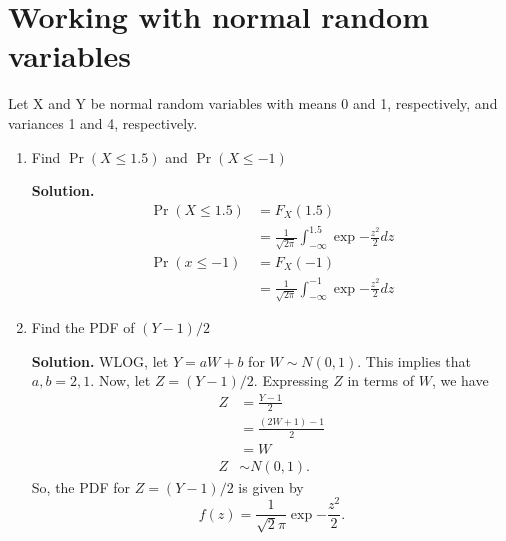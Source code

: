\documentclass[12pt]{article}
\begin{document}
\section{Working with normal random variables}
Let X and Y be normal random variables with means 0 and 1, respectively, and variances 1 and 4, respectively.
\begin{enumerate}
    \item Find $\Pr(X \leq 1.5)$ and $\Pr(X \leq -1)$

    \textbf{Solution.}
    \begin{align*}
        \Pr(X \leq 1.5) &= F_X(1.5) 
        \\ &= \frac{1}{\sqrt{2\pi}}\int_{-\infty}^{1.5} \exp{-\frac{z^2}{2}}dz
        \\ \Pr(x \leq -1)&= F_X(-1) 
                \\ &= \frac{1}{\sqrt{2\pi}}\int_{-\infty}^{-1} \exp{-\frac{z^2}{2}}dz
    \end{align*}
    

    \item Find the PDF of $(Y-1)/2$

        \textbf{Solution.}
    WLOG, let $Y = aW+b$ for $W \sim N(0,1)$. This implies that $a,b = 2,1$. Now, let $Z=(Y-1)/2$. Expressing $Z$ in terms of $W$, we have
    \begin{align*}
        Z &= \frac{Y-1}{2}
        \\ &= \frac{(2W+1)-1}{2}
        \\ &= W
        \\ Z &\sim N(0,1).
    \end{align*}
    So, the PDF for $Z=(Y-1)/2$ is given by 
    \[  f(z) = \frac{1}{\sqrt{2}\pi}\exp{-\frac{z^2}{2}}.\]
\end{enumerate}
\end{document}

